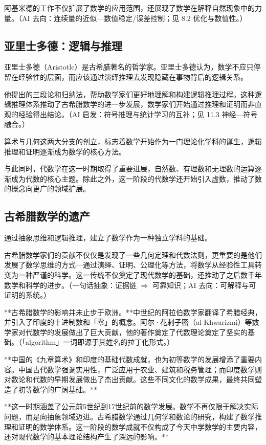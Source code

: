 阿基米德的工作不仅扩展了数学的应用范围，还展现了数学在解释自然现象中的力量。{（AI 去向：连续量的近似—数值稳定/误差控制；见 8.2 优化与数值性。）}

\subsection{亚里士多德：逻辑与推理}

亚里士多德（Aristotle）是古希腊著名的哲学家。亚里士多德认为，数学不应只停留在经验性的层面，而应该通过演绎推理去发现隐藏在事物背后的逻辑关系。

他提出的三段论和归纳法，帮助数学家们更好地理解和构建逻辑推理过程。这种逻辑推理体系推动了古希腊数学的进一步发展，数学家们开始通过推理和证明而非直观的经验得出结论。{（AI 启发：符号推理与统计学习的互补；见 11.3 神经—符号融合。）}

算术与几何这两大分支的创立，标志着数学开始作为一门理论化学科的诞生，逻辑推理和证明逐渐成为数学的核心方法。

与此同时，代数学在这一时期取得了重要进展，自然数、有理数和无理数的运算逐渐成为代数的核心主题。除此之外，这一阶段的代数学还开始引入虚数，推动了数的概念向更广的领域扩展。

\subsection{古希腊数学的遗产}

通过抽象思维和逻辑推理，建立了数学作为一种独立学科的基础。

古希腊数学家们的贡献不仅仅是发现了一些几何定理和代数法则，更重要的是他们发展了数学思维的方式---通过演绎、证明、公理化等方法，将数学从经验性工具转变为一种严谨的科学。这一传统不仅奠定了现代数学的基础，还推动了之后数千年数学和科学的进步。{（一句话抽象：证据链 $\Rightarrow$ 可靠知识；AI 去向：可解释与可证明的系统。）}

**古希腊数学的影响并未止步于欧洲。**中世纪的阿拉伯数学家翻译了希腊经典，并引入了印度的十进制数和「零」的概念。阿尔·花剌子密（al-Khwarizmi）等数学家对代数学的发展做出了巨大贡献，他的著作奠定了代数理论奠定了坚实的基础。{（「algorithm」一词即源于其姓名的拉丁化形式。）}

**中国的《九章算术》和印度的基础代数成就，也为初等数学的发展增添了重要内容。中国古代数学强调实用性，广泛应用于农业、建筑和税务管理；而印度数学则对数论和代数的早期发展做出了杰出贡献。这些不同文化的数学成果，最终共同塑造了初等数学的广阔基础。**

**这一时期涵盖了公元前5世纪到17世纪前的数学发展。数学不再仅限于解决实际问题，而是向抽象领域迈进。古希腊数学通过几何学和数论的研究，构建了数学推理和证明的数学体系。这一阶段的数学成就不仅构成了今天中学数学的主要内容，还对现代数学的基本理论结构产生了深远的影响。**

